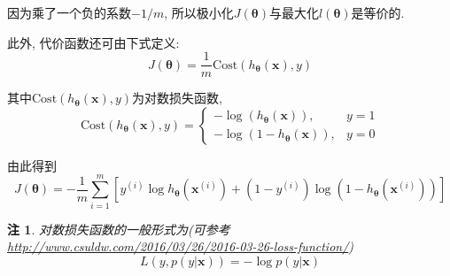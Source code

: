 \documentclass[a4paper,UTF8]{ctexart}
\theoremstyle{plain} \newtheorem{theorem}{定理}[section]
\theoremstyle{plain} \newtheorem{definition}{定义}[section]
\theoremstyle{plain} \newtheorem{lemma}{引理}[section]
\theoremstyle{plain} \newtheorem{proposition}{命题}[section]
\theoremstyle{plain} \newtheorem{example}{例}[section]
\theoremstyle{plain} \newtheorem{remark}{注}[section]
\theoremstyle{plain} \newtheorem{corollary}{推论}[section]
\begin{document}
因为乘了一个负的系数$-1 / m$, 所以极小化$J(\bm{\theta})$与最大化$l(\bm{\theta})$是等价的.

此外, 代价函数还可由下式定义:
\begin{equation*}
J(\bm{\theta}) = \frac{1}{m} \mathrm{Cost}(h_{\bm{\theta}}(\bm{x}),y)
\end{equation*}

其中$\mathrm{Cost}(h_{\bm{\theta}}(\bm{x}), y)$为对数损失函数, 
$$
\mathrm{Cost}(h_{\bm{\theta}}(\bm{x}), y) = 
\begin{cases}
-\log(h_{\bm{\theta}}(\bm{x}))  , & y = 1 \\
-\log(1 - h_{\bm{\theta}}(\bm{x})) , & y = 0
\end{cases}
$$

由此得到
\begin{equation*}
J(\bm{\theta}) = - \frac{1}{m} \sum_{i=1}^{m} \left[ y^{(i)} \log h_{\bm{\theta}}(\bm{x}^{(i)}) + (1 - y^{(i)}) \log (1 - h_{\bm{\theta}}(\bm{x}^{(i)})) \right]
\end{equation*}

\begin{remark}
对数损失函数的一般形式为(可参考\url{http://www.csuldw.com/2016/03/26/2016-03-26-loss-function/})
\begin{equation*}
L(y, p(y | \bm{x})) = - \log p(y | \bm{x})
\end{equation*}

\end{remark}
\end{document}
